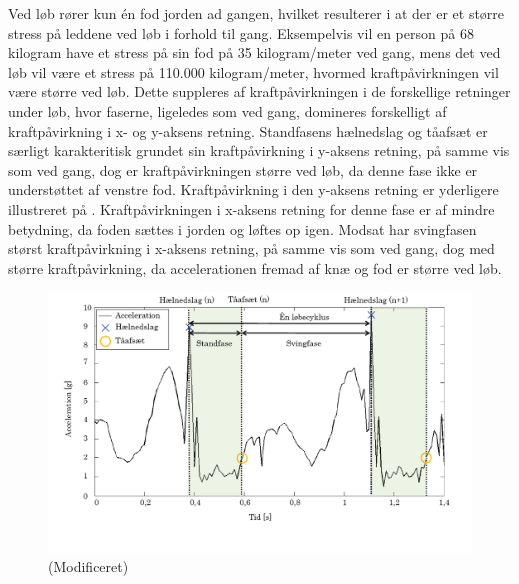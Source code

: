 Ved løb rører kun én fod jorden ad gangen, hvilket resulterer i at der er et større stress på leddene ved løb i forhold til gang. Eksempelvis vil en person på 68 kilogram have et stress på sin fod på 35 kilogram/meter ved gang, mens det ved løb vil være et stress på 110.000 kilogram/meter, hvormed kraftpåvirkningen vil være større ved løb. \citep{Adelaar1986}
Dette suppleres af kraftpåvirkningen i de forskellige retninger under løb, hvor faserne, ligeledes som ved gang, domineres forskelligt af kraftpåvirkning i x- og y-aksens retning. \newline 
Standfasens hælnedslag og tåafsæt er særligt karakteritisk grundet sin kraftpåvirkning i y-aksens retning, på samme vis som ved gang, dog er kraftpåvirkningen større ved løb, da denne fase ikke er understøttet af venstre fod. Kraftpåvirkning i den y-aksens retning er yderligere illustreret på .\newline
Kraftpåvirkningen i x-aksens retning for denne fase er af mindre betydning, da foden sættes i jorden og løftes op igen. 
Modsat har svingfasen størst kraftpåvirkning i x-aksens retning, på samme vis som ved gang, dog med større kraftpåvirkning, da accelerationen fremad af knæ og fod er større ved løb. \citep{Rueterbories2010} 

\begin{figure}[H]
	\centering
	\includegraphics[scale=0.4]{figures/bProblemloesning/loeb_skolebog.png}
	\caption{ \citep{WeyandKelly2001} (Modificeret)}
	\label{fig:loeb_skolebog}
\end{figure}

